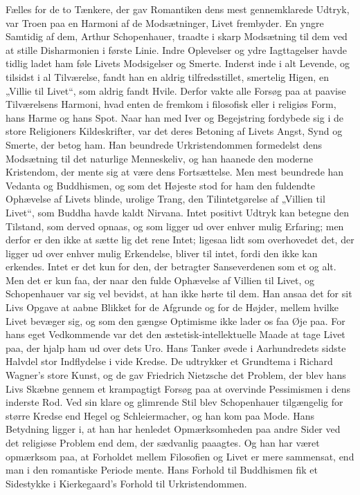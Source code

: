 \documentclass[12pt,a4paper,openany]{book}
\newcommand{\opage}[1]{\marginnote{\footnotesize\textit{[#1]}}}
\begin{document}
Fælles for de to Tænkere, der gav Romantiken dens mest gennemklarede
Udtryk, var Troen paa en Harmoni af de Modsætninger, Livet
frembyder. En yngre Samtidig af dem, Arthur Schopenhauer,
traadte i skarp Modsætning til dem ved at stille Disharmonien i første
Linie. Indre Oplevelser og ydre Iagttagelser havde tidlig ladet
ham føle Livets Modsigelser og Smerte. Inderst inde i alt Levende, og
tilsidst i al Tilværelse, fandt han en aldrig tilfredsstillet, smertelig
Higen, en „Villie til Livet“, som aldrig fandt Hvile. Derfor vakte alle
Forsøg paa at paavise Tilværelsens Harmoni, hvad enten de fremkom
i filosofisk eller i religiøs Form, hans Harme og hans Spot.
Naar han med Iver og Begejstring fordybede sig i de store Religioners
Kildeskrifter, var det deres Betoning af Livets Angst, Synd og
Smerte, der betog ham. Han beundrede Urkristendommen formedelst
dens Modsætning til det naturlige Menneskeliv, og han haanede
den moderne Kristendom, der mente sig at være dens Fortsættelse.
Men mest beundrede han Vedanta og Buddhismen, og som
det Højeste stod for ham den fuldendte Ophævelse af Livets blinde,
urolige Trang, den Tilintetgørelse af „Villien til Livet“, som Buddha
havde kaldt Nirvana. Intet positivt Udtryk kan betegne den Tilstand,
som derved opnaas, og som ligger ud over enhver mulig Erfaring;
men derfor er den ikke at sætte lig det rene Intet; ligesaa lidt
som overhovedet det, der ligger ud over enhver mulig Erkendelse,
bliver til intet, fordi den ikke kan erkendes. Intet er det kun for
den, der betragter Sanseverdenen som et og alt. Men det er kun faa,
der naar den fulde Ophævelse af Villien til Livet, og Schopenhauer
var sig vel bevidst, at han ikke hørte til dem. Han ansaa det for sit
Livs Opgave at aabne Blikket for de Afgrunde og for de Højder,
mellem hvilke Livet bevæger sig, og som den gængse Optimisme ikke
lader os faa Øje paa. For hans eget Vedkommende var det den æstetisk-intellektuelle Maade at tage Livet paa, der hjalp ham ud over
dets Uro. Hans Tanker øvede i Aarhundredets sidste Halvdel stor
Indflydelse i vide Kredse. De udtrykker et Grundtema i Richard
\opage{128}Wagner’s store Kunst, og de gav Friedrich Nietzsche det Problem,
der blev hans Livs Skæbne gennem et krampagtigt Forsøg paa at
overvinde Pessimismen i dens inderste Rod. Ved sin klare og glimrende
Stil blev Schopenhauer tilgængelig for større Kredse end Hegel
og Schleiermacher, og han kom paa Mode. Hans Betydning ligger i,
at han har henledet Opmærksomheden paa andre Sider ved det religiøse
Problem end dem, der sædvanlig paaagtes. Og han har været
opmærksom paa, at Forholdet mellem Filosofien og Livet er mere
sammensat, end man i den romantiske Periode mente. Hans Forhold
til Buddhismen fik et Sidestykke i Kierkegaard’s Forhold til
Urkristendommen.
\end{document}

